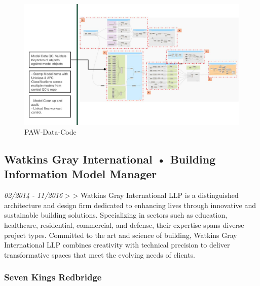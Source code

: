 \documentclass[
]{article}
\begin{document}
\begin{figure}[H]

{\centering \includegraphics{assets/PAW/2020-Portfolio-Google-Slides-dynamo2.jpg}

}

\caption{PAW-Data-Code}

\end{figure}%

\subsection{Watkins Gray International • Building Information Model
Manager}\label{watkins-gray-international-building-information-model-manager}

\emph{02/2014 - 11/2016} \textgreater{} \textgreater{} Watkins Gray
International LLP is a distinguished architecture and design firm
dedicated to enhancing lives through innovative and sustainable building
solutions. Specializing in sectors such as education, healthcare,
residential, commercial, and defense, their expertise spans diverse
project types. Committed to the art and science of building, Watkins
Gray International LLP combines creativity with technical precision to
deliver transformative spaces that meet the evolving needs of clients.

\subsubsection{Seven Kings Redbridge}\label{seven-kings-redbridge}
\end{document}
